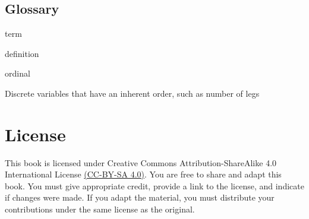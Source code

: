 \documentclass[
  oneside]{book}
\begin{document}
\hypertarget{glossary}{%
\section{Glossary}\label{glossary}}

term

definition

ordinal

Discrete variables that have an inherent order, such as number of legs

\hypertarget{license}{%
\chapter*{License}\label{license}}

This book is licensed under Creative Commons Attribution-ShareAlike 4.0 International License \href{https://creativecommons.org/licenses/by-sa/4.0/}{(CC-BY-SA 4.0)}. You are free to share and adapt this book. You must give appropriate credit, provide a link to the license, and indicate if changes were made. If you adapt the material, you must distribute your contributions under the same license as the original.

  
\end{document}
